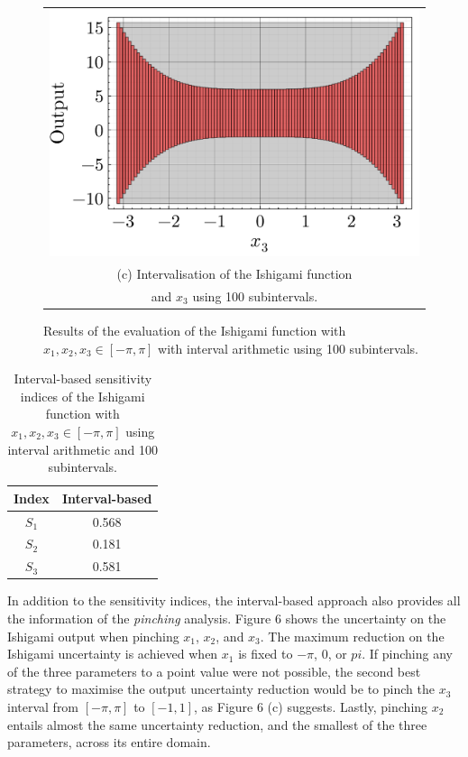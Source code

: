 \documentclass[twocolumn]{rps-esrel2022}
\begin{document}
\begin{figure}[!h]
	\begin{tabular}{@{}c@{}}
		\includegraphics[width=\linewidth]{figures/ishigami_3.pdf} \\[\abovecaptionskip]
		\small (c) Intervalisation of the Ishigami function\\
		\small and $x_3$ using 100 subintervals.
	  \end{tabular}

	\caption{Results of the evaluation of the Ishigami function with $x_1,x_2,x_3 \in [-\pi,\pi]$ with interval arithmetic using 100 subintervals.
	}
\end{figure}

\begin{table}[!h]
	\centering
	\caption{Interval-based sensitivity indices of the Ishigami function with $x_1,x_2,x_3 \in [-\pi,\pi]$ using interval arithmetic
	and 100 subintervals.}
	\begin{tabular}{cc}
	\hline
	Index & Interval-based \\ \hline
	$S_1$ & 0.568 \\
	$S_2$ & 0.181 \\
	$S_3$ & 0.581 \\ \hline
	\end{tabular}%
\end{table}

In addition to the sensitivity indices, the interval-based approach also provides all the information of the \textit{pinching} analysis.
Figure 6 shows the uncertainty on the Ishigami output when pinching $x_1$, $x_2$, and $x_3$.
The maximum reduction on the Ishigami uncertainty is achieved when $x_1$ is fixed to $-\pi$, $0$, or $pi$.
If pinching any of the three parameters to a point value were not possible, the second best strategy to maximise the output uncertainty
reduction would be to pinch the $x_3$ interval from $[-\pi,\pi]$ to $[-1,1]$, as Figure 6 (c) suggests.
Lastly, pinching $x_2$ entails almost the same uncertainty reduction, and the smallest of the three parameters, across its entire domain.
\end{document}
